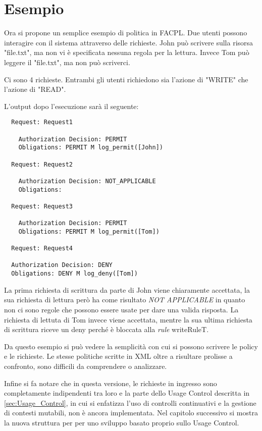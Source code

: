\section{Esempio}
\label{sec:Esempio}
Ora si propone un semplice esempio di politica in FACPL. Due utenti possono interagire con il sistema attraverso delle richieste.
John può scrivere sulla risorsa "file.txt", ma non vi è specificata nessuna regola per la lettura. Invece Tom può
leggere il "file.txt", ma non può scriverci.\par

Ci sono 4 richieste. Entrambi gli utenti richiedono sia l'azione di "WRITE" che l'azione di "READ".

L'output dopo l'esecuzione sarà il seguente:
\begin{verbatim}
  Request: Request1

    Authorization Decision: PERMIT
    Obligations: PERMIT M log_permit([John])

  Request: Request2

    Authorization Decision: NOT_APPLICABLE
    Obligations:

  Request: Request3

    Authorization Decision: PERMIT
    Obligations: PERMIT M log_permit([Tom])

  Request: Request4

  Authorization Decision: DENY
  Obligations: DENY M log_deny([Tom])
\end{verbatim}
La prima richiesta di scrittura da parte di John viene chiaramente accettata, la sua richiesta di lettura però ha
come risultato \emph{NOT APPLICABLE} in quanto non ci sono regole che possono essere usate per dare una valida risposta.
La richiesta di lettuta di Tom invece viene accettata, mentre la sua ultima richiesta di scrittura riceve un deny
perché è bloccata alla \emph{rule} writeRuleT.\par
Da questo esempio si può vedere la semplicità con cui si possono scrivere le policy e le richieste.
Le stesse politiche scritte in XML oltre a risultare prolisse a confronto, sono difficili da comprendere o analizzare.\par
Infine si fa notare che in questa versione, le richieste in ingresso sono completamente indipendenti tra loro e
la parte dello Usage Control descritta in \ref{sec:Usage_Control}, in cui si enfatizza l'uso di controlli continuativi e
la gestione di contesti mutabili, non è ancora implementata. Nel capitolo successivo si mostra la nuova struttura per
per uno sviluppo basato proprio sullo Usage Control.
